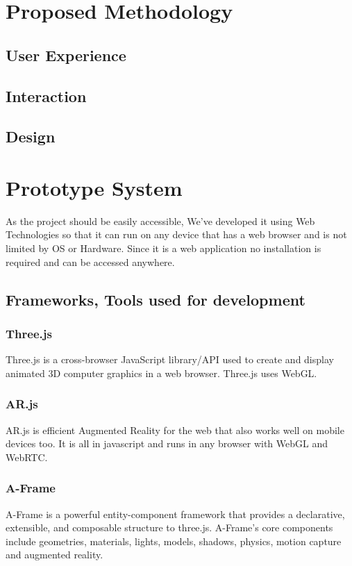 \documentclass[conference]{IEEEtran}
\begin{document}
\section{Proposed Methodology}
\subsection{User Experience}
\subsection{Interaction}
\subsection{Design}

\section{Prototype System}
As the project should be easily accessible, We've developed it using Web Technologies so that it can run on any device that has a web browser and is not limited by OS or Hardware.
Since it is a web application no installation is required and can be accessed anywhere.


\subsection{Frameworks, Tools used for development}
\subsubsection{Three.js} Three.js is a cross-browser JavaScript library/API used to create and display animated 3D computer graphics in a web browser. Three.js uses WebGL.
\subsubsection{AR.js}AR.js is efficient Augmented Reality for the web that also works well on mobile devices too. It is all in javascript and runs in any browser with WebGL and WebRTC. 
\subsubsection{A-Frame} A-Frame is a powerful entity-component framework that provides a declarative, extensible, and composable structure to three.js.
A-Frame’s core components include geometries, materials, lights, models, shadows, physics, motion capture and augmented reality.
\end{document}

